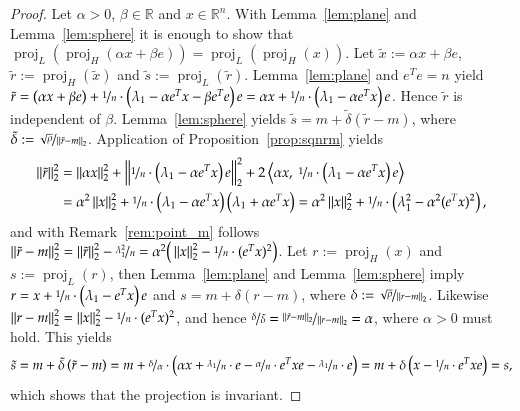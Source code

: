 \documentclass[twoside,11pt]{article}
\DeclareMathOperator{\proj}{proj}
\newcommand{\R}{\mathbb{R}}
\newcommand{\0}{\mathcal{O}}
\newcommand{\transp}{^T}
\newcommand{\norm}[1]{\left\Vert#1\right\Vert}
\newcommand{\scp}[2]{\left<#1,\ #2\right>}
\begin{document}
\begin{proof}
Let $\alpha > 0$, $\beta\in\R$ and $x\in\R^n$.
With Lemma~\ref{lem:plane} and Lemma~\ref{lem:sphere} it is enough to show that $\proj_L(\proj_H(\alpha x + \beta e)) = \proj_L(\proj_H(x))$.
Let $\tilde{x} := \alpha x + \beta e$, $\tilde{r} := \proj_H(\tilde{x})$ and $\tilde{s} := \proj_L(\tilde{r})$.
Lemma~\ref{lem:plane} and $e\transp e = n$ yield $\tilde{r} = \left(\alpha x + \beta e\right) + \nicefrac{1}{n}\cdot\left(\lambda_1 - \alpha e\transp x - \beta e\transp e\right)e = \alpha x + \nicefrac{1}{n}\cdot\left(\lambda_1 - \alpha e\transp x\right)e$.
Hence $\tilde{r}$ is independent of $\beta$.
Lemma~\ref{lem:sphere} yields $\tilde{s} = m + \tilde{\delta}\left(\tilde{r} - m\right)$, where $\tilde{\delta} := \nicefrac{\sqrt{\rho}}{\norm{\tilde{r} - m}_2}$.
Application of Proposition~\ref{prop:sqnrm} yields
\begin{align*}
  \norm{\tilde{r}}_2^2
  &= \norm{\alpha x}_2^2 + \norm{\nicefrac{1}{n}\cdot\left(\lambda_1 - \alpha e\transp x\right)e}_2^2 + 2\scp{\alpha x}{\nicefrac{1}{n}\cdot\left(\lambda_1 - \alpha e\transp x\right)e}\\
  &= \alpha^2\norm{x}_2^2 + \nicefrac{1}{n}\cdot\left(\lambda_1 - \alpha e\transp x\right)\left(\lambda_1 + \alpha e\transp x\right)
  = \alpha^2\norm{x}_2^2 + \nicefrac{1}{n}\cdot\left(\lambda_1^2 - \alpha^2 (e\transp x)^2\right)\text{,}
\end{align*}
and with Remark~\ref{rem:point_m} follows $\norm{\tilde{r} - m}_2^2 = \norm{\tilde{r}}_2^2 - \nicefrac{\lambda_1^2}{n} = \alpha^2\big(\norm{x}_2^2 - \nicefrac{1}{n}\cdot(e\transp x)^2\big)$.
Let $r := \proj_H(x)$ and $s := \proj_L(r)$, then Lemma~\ref{lem:plane} and Lemma~\ref{lem:sphere} imply $r = x + \nicefrac{1}{n}\cdot\left(\lambda_1 - e\transp x\right)e$ and $s = m + \delta\left(r - m\right)$, where $\delta := \nicefrac{\sqrt{\rho}}{\norm{r - m}_2}$.
Likewise $\norm{r - m}_2^2 = \norm{x}_2^2 - \nicefrac{1}{n}\cdot(e\transp x)^2$, and hence $\nicefrac{\delta}{\tilde{\delta}} = \nicefrac{\norm{\tilde{r} - m}_2}{\norm{r - m}_2} = \alpha$, where $\alpha > 0$ must hold.
This yields
\begin{displaymath}
  \tilde{s}
  = m + \tilde{\delta}\left(\tilde{r} - m\right)
  = m + \nicefrac{\delta}{\alpha}\cdot\left(\alpha x + \nicefrac{\lambda_1}{n}\cdot e - \nicefrac{\alpha}{n}\cdot e\transp x e - \nicefrac{\lambda_1}{n}\cdot e\right)
  = m + \delta\left(x - \nicefrac{1}{n}\cdot e\transp xe\right) = s\text{,}
\end{displaymath}
which shows that the projection is invariant.
\end{proof}
\end{document}
